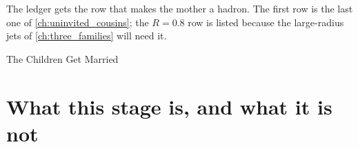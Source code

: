 The ledger gets the row that makes the mother a hadron. The first row is
the last one of \cref{ch:uninvited_cousins}; the $R=0.8$ row is listed
because the large-radius jets of \cref{ch:three_families} will need it.

\begin{ledger}{The Children Get Married}
\end{ledger}

\section{What this stage is, and what it is not}
\label{sec:children_getting_married:caveats}

